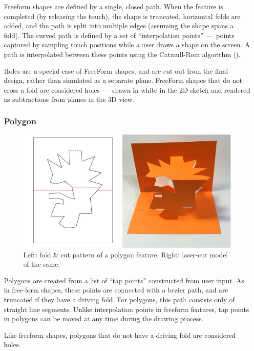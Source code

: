 Freeform shapes are defined by a single, closed path. When the feature
is completed (by releasing the touch), the shape is truncated,
horizontal folds are added, and the path is split into multiple edges
(assuming the shape spans a fold). The curved path is defined by a set
of ``interpolation points'' ---~points captured by sampling touch
positions while a user draws a shape on the screen. A path is
interpolated between these points using the Catmull-Rom algorithm
(\citet{catmull1974class}).

Holes are a special case of FreeForm shapes, and are cut out from the
final design, rather than simulated as a separate plane. FreeForm shapes
that do not cross a fold are considered holes ---~drawn in white in the
2D sketch and rendered as subtractions from planes in the 3D view.

\subsubsection{Polygon}\label{polygon}

\begin{figure}[htbp]
\centering
\includegraphics{figures/33_UI_Interface_Data_Structures/poly.pdf}
\caption{Left: fold \& cut pattern of a polygon feature. Right:
laser-cut model of the same.}
\end{figure}

Polygons are created from a list of ``tap points'' constructed from user
input. As in free-form shapes, these points are connected with a bezier
path, and are truncated if they have a driving fold. For polygons, this
path consists only of straight line segments. Unlike interpolation
points in freeform features, tap points in polygons can be moved at any
time during the drawing process.

Like freeform shapes, polygons that do not have a driving fold are
considered holes.

